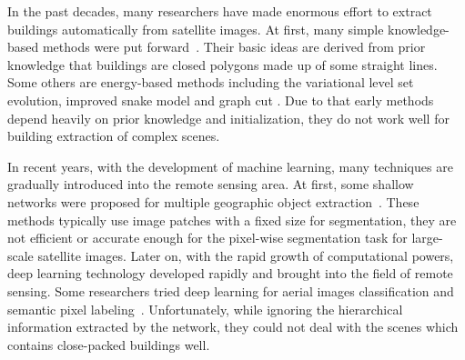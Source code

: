 In the past decades, many researchers have made enormous effort to extract buildings automatically from satellite images.
At first, many simple knowledge-based methods were put forward~\cite{IEEEexample:huertas1988detecting,IEEEexample:noronha2001detection,IEEEexample:nosrati2009novel, IEEEexample:izadi2012three,IEEEexample:wang2015efficient}.
Their basic ideas are derived from prior knowledge that buildings are closed polygons made up of some straight lines.
Some others are energy-based methods including the variational level set evolution, improved snake model and graph cut \cite{IEEEexample:cote2013automatic, IEEEexample:peng2005improved,IEEEexample:sirmacek2009urban}. 
Due to that early methods depend heavily on prior knowledge and initialization, they do not work well for building extraction of complex scenes.


In recent years, with the development of machine learning, many  techniques are gradually introduced into the remote sensing area.
At first, some shallow networks were proposed for multiple geographic object extraction~\cite{IEEEexample:mnih2013machine, IEEEexample:saito2016multiple,IEEEexample:alshehhi2017simultaneous,IEEEexample:zhao2017contextually}. 
These methods typically use image patches with a fixed size for segmentation, they are not efficient or accurate enough for the pixel-wise segmentation task for large-scale satellite images.
%
Later on, with the rapid growth of computational powers, deep learning technology developed rapidly and brought into the field of remote sensing. Some researchers tried deep learning for aerial images classification and semantic pixel labeling~\cite{IEEEexample:paisitkriangkrai2015effective,IEEEexample:liu2017dense,IEEEexample:audebert2017deep,IEEEexample:kampffmeyer2017urban,IEEEexample:he2017multi}. 
Unfortunately, while ignoring the hierarchical information extracted by the network, they could not deal with the scenes which contains close-packed buildings well.



